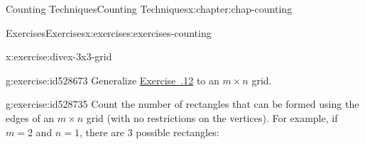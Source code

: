 \documentclass[oneside,10pt,]{book}
\newcommand{\xreffont}{\relax}
\numberwithin{equation}{section}
\begin{document}
\begin{chapterptx}{Counting Techniques}{}{Counting Techniques}{}{}{x:chapter:chap-counting}
\begin{exercises-section}{Exercises}{}{Exercises}{}{}{x:exercises:exercises-counting}
\begin{divisionexercise}{12}{}{}{x:exercise:divex-3x3-grid}
\begin{sidebyside}{3}{0.0916666666666667}{0.0916666666666667}{0.183333333333333}
\begin{sbspanel}{0.15}%
%
\end{sbspanel}%
\begin{sbspanel}{0.15}%
%
\end{sbspanel}%
\end{sidebyside}%
\end{divisionexercise}%
\begin{divisionexercise}{13}{}{}{g:exercise:id528673}%
Generalize \hyperlink{x:exercise:divex-3x3-grid}{Exercise~{\xreffont 2.7.12}} to an \(m \times n\) grid.%
\end{divisionexercise}%
\begin{divisionexercise}{14}{}{}{g:exercise:id528735}%
Count the number of rectangles that can be formed using the edges of an \(m \times n\) grid (with no restrictions on the vertices). For example, if \(m = 2\) and \(n = 1\), there are 3 possible rectangles:%
\begin{sidebyside}{3}{0.0916666666666667}{0.0916666666666667}{0.183333333333333}%
\begin{sbspanel}{0.15}%
%
\end{sbspanel}%
\begin{sbspanel}{0.15}%
%
\end{sbspanel}%
\begin{sbspanel}{0.15}%

\end{sbspanel}
\end{sidebyside}
\end{divisionexercise}
\end{exercises-section}
\end{chapterptx}
\end{document}
